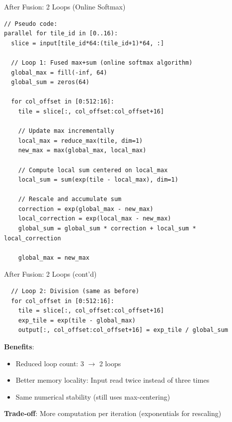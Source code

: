\documentclass[aspectratio=169]{beamer}
\begin{document}
\begin{frame}[fragile]{After Fusion: 2 Loops (Online Softmax)}
\begin{lstlisting}
// Pseudo code:
parallel for tile_id in [0..16):
  slice = input[tile_id*64:(tile_id+1)*64, :]

  // Loop 1: Fused max+sum (online softmax algorithm)
  global_max = fill(-inf, 64)
  global_sum = zeros(64)

  for col_offset in [0:512:16]:
    tile = slice[:, col_offset:col_offset+16]

    // Update max incrementally
    local_max = reduce_max(tile, dim=1)
    new_max = max(global_max, local_max)

    // Compute local sum centered on local_max
    local_sum = sum(exp(tile - local_max), dim=1)

    // Rescale and accumulate sum
    correction = exp(global_max - new_max)
    local_correction = exp(local_max - new_max)
    global_sum = global_sum * correction + local_sum * local_correction

    global_max = new_max
\end{lstlisting}
\end{frame}

\begin{frame}[fragile]{After Fusion: 2 Loops (cont'd)}
\begin{lstlisting}
  // Loop 2: Division (same as before)
  for col_offset in [0:512:16]:
    tile = slice[:, col_offset:col_offset+16]
    exp_tile = exp(tile - global_max)
    output[:, col_offset:col_offset+16] = exp_tile / global_sum
\end{lstlisting}

\vspace{0.5cm}

\textbf{Benefits}:
\begin{itemize}
\item Reduced loop count: 3 $\rightarrow$ 2 loops
\item Better memory locality: Input read twice instead of three times
\item Same numerical stability (still uses max-centering)
\end{itemize}

\vspace{0.3cm}

\textbf{Trade-off}: More computation per iteration (exponentials for rescaling)
\end{frame}
\end{document}
